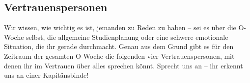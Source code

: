 \subsection{Vertrauenspersonen}
Wir wissen, wie wichtig es ist, jemanden zu Reden zu haben -- sei es über die O-Woche selbst, die
allgemeine Studienplanung oder eine schwere emotionale Situation, die ihr gerade durchmacht. Genau aus dem Grund
gibt es für den Zeitraum der gesamten O-Woche die folgenden vier Vertrauenspersonen, mit denen ihr im Vertrauen über
alles sprechen könnt. Sprecht uns an -- ihr erkennt uns an einer Kapitänsbinde!

